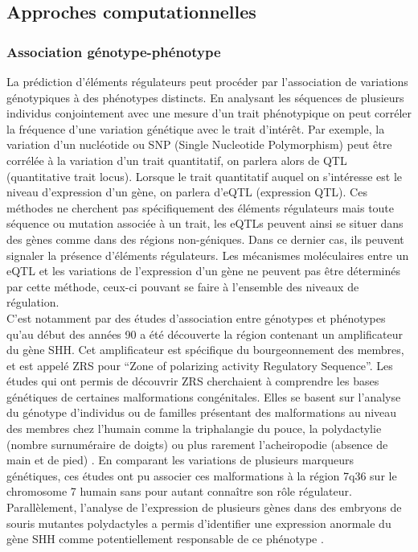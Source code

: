 \subsection{Approches computationnelles}
\label{subsec:approch-comput}

\subsubsection{Association génotype-phénotype}
\label{subsubsec:geno-pheno}

La prédiction d’éléments régulateurs peut procéder par l’association de variations génotypiques à des phénotypes distincts. En analysant les séquences de plusieurs individus conjointement avec une mesure d’un trait phénotypique on peut corréler la fréquence d’une variation génétique avec le trait d'intérêt. Par exemple, la variation d’un nucléotide ou SNP (Single Nucleotide Polymorphism) peut être corrélée à la variation d’un trait quantitatif, on parlera alors de QTL (quantitative trait locus). Lorsque le trait quantitatif auquel on s’intéresse est le niveau d’expression d’un gène, on parlera d’eQTL (expression QTL). Ces méthodes ne cherchent pas spécifiquement des éléments régulateurs mais toute séquence ou mutation associée à un trait, les eQTLs peuvent ainsi se situer dans des gènes comme dans des régions non-géniques. Dans ce dernier cas, ils peuvent signaler la présence d'éléments régulateurs. Les mécanismes moléculaires entre un eQTL et les variations de l’expression d’un gène ne peuvent pas être déterminés par cette méthode, ceux-ci pouvant se faire à l’ensemble des niveaux de régulation. \\

C’est notamment par des études d’association entre génotypes et phénotypes qu’au début des années 90 a été découverte la région contenant un \gls{amplificateur} du gène \acrshort{SHH}. Cet \gls{amplificateur} est spécifique du bourgeonnement des membres, et est appelé \acrshort{ZRS} pour “Zone of polarizing activity Regulatory Sequence”. Les études qui ont permis de découvrir \acrshort{ZRS} cherchaient à comprendre les bases génétiques de certaines malformations congénitales. Elles se basent sur l’analyse du génotype d’individus ou de familles présentant des malformations au niveau des membres chez l’humain comme la triphalangie du pouce, la polydactylie (nombre surnuméraire de doigts) ou plus rarement l’acheiropodie (absence de main et de pied) \citep{hing_linkage_1995, zguricas_clinical_1999}. En comparant les variations de plusieurs marqueurs génétiques, ces études ont pu associer ces malformations à la région 7q36 sur le chromosome 7 humain sans pour autant connaître son rôle régulateur. Parallèlement, l’analyse de l’expression de plusieurs gènes dans des embryons de souris mutantes polydactyles a permis d’identifier une expression anormale du gène \acrshort{SHH} comme potentiellement responsable de ce phénotype \citep{sharpe_identification_1999}. \\

